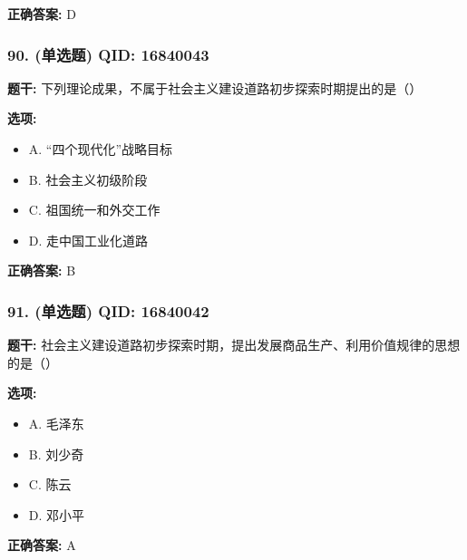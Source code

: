 \documentclass[12pt,UTF8]{ctexart}
\begin{document}
\textbf{正确答案:}
D

\vspace{0.3em}\hrulefill\vspace{0.7em}

\subsubsection*{90. (单选题) \small QID: 16840043}

\textbf{题干:}
下列理论成果，不属于社会主义建设道路初步探索时期提出的是（）

\textbf{选项:}
\begin{itemize}[leftmargin=*]

  \item A. “四个现代化”战略目标

  \item B. 社会主义初级阶段

  \item C. 祖国统一和外交工作

  \item D. 走中国工业化道路

\end{itemize}

\textbf{正确答案:}
B

\vspace{0.3em}\hrulefill\vspace{0.7em}

\subsubsection*{91. (单选题) \small QID: 16840042}

\textbf{题干:}
社会主义建设道路初步探索时期，提出发展商品生产、利用价值规律的思想的是（）

\textbf{选项:}
\begin{itemize}[leftmargin=*]

  \item A. 毛泽东

  \item B. 刘少奇

  \item C. 陈云

  \item D. 邓小平

\end{itemize}

\textbf{正确答案:}
A

\vspace{0.3em}\hrulefill\vspace{0.7em}
\end{document}
